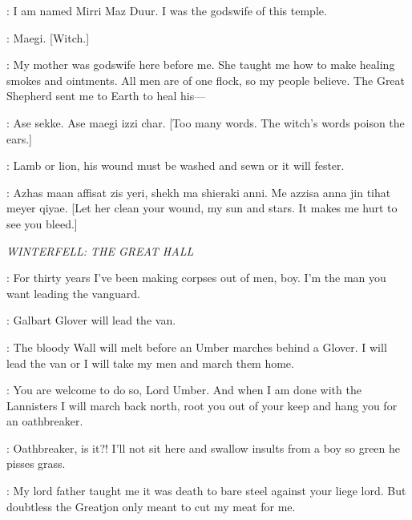 \MIRRI: I am named Mirri Maz Duur. I was the godswife of this temple.  

\RAKHARO: Maegi. [Witch.] 

\MIRRI: My mother was godswife here before me. She taught me how to make healing smokes and ointments. All men are of one flock, so my people believe. The Great Shepherd sent me to Earth to heal his---


\RAKHARO: Ase sekke. Ase maegi izzi char. [Too many words. The witch's words poison the ears.] 

\MIRRI: Lamb or lion, his wound must be washed and sewn or it will fester. 

\DAENERYS: Azhas maan affisat zis yeri, shekh ma shieraki anni. Me azzisa anna jin tihat meyer qiyae. [Let her clean your wound, my sun and stars. It makes me hurt to see you bleed.] 



\scene

\textit{WINTERFELL: THE GREAT HALL}


\UMBER: For thirty years I've been making corpses out of men, boy. I'm the man you want leading the vanguard. 

\ROBB: Galbart Glover will lead the van. 

\UMBER: The bloody Wall will melt before an Umber marches behind a Glover. I will lead the van or I will take my men and march them home. 

\ROBB: You are welcome to do so, Lord Umber.  And when I am done with the Lannisters I will march back north, root you out of your keep and hang you for an oathbreaker. 

\UMBER: Oathbreaker, is it?!  I'll not sit here and swallow insults from a boy so green he pisses grass. 


\ROBB: My lord father taught me it was death to bare steel against your liege lord. But doubtless the Greatjon only meant to cut my meat for me. 


